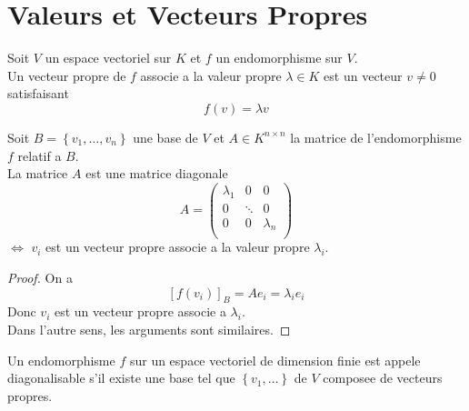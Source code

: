 \documentclass[../main.tex]{subfiles}
\begin{document}
\section{Valeurs et Vecteurs Propres}
\begin{defn}\label{defn:Vecteur proprevecteur_propre}
	Soit $V$ un espace vectoriel sur $K$ et $f$ un endomorphisme sur $V$.\\
	Un vecteur propre de $f$ associe a la valeur propre $\lambda \in K$ est un vecteur $v \neq 0$ satisfaisant
	\[ 
		f( v) = \lambda v
	\]
	
\end{defn}
\begin{lemma}
Soit  $B = \left\{ v_1, \ldots, v_n \right\} $ une base de $V$ et $A \in K^{n\times n}$ la matrice de l'endomorphisme $f$ relatif a $B$.\\
La matrice $A$ est une matrice diagonale 
\[ 
A = 
\begin{pmatrix}
	\lambda_1 & 0 & 0 \\
	0 & \ddots & 0 \\
	0 & 0 & \lambda_n \\
\end{pmatrix}
\]
$\iff$ $v_i$ est un vecteur propre associe a la valeur propre $\lambda_i$.

\end{lemma}
\begin{proof}
On a
\[ 
	[ f( v_i) ]_B = A e_i = \lambda_i e_i 
\]
Donc $v_i$ est un vecteur propre associe a $\lambda_i$.\\
Dans l'autre sens, les arguments sont similaires.
\end{proof}
\begin{defn}
	Un endomorphisme $f$ sur un espace vectoriel de dimension finie est appele diagonalisable s'il existe une base tel que $ \left\{ v_1, \ldots  \right\} $ de $V$ composee de vecteurs propres.
\end{defn}
\end{document}
